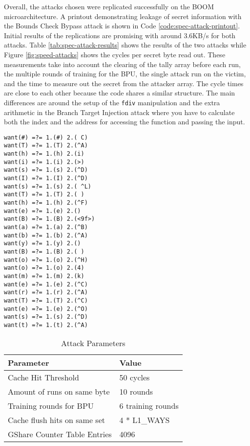 Overall, the attacks chosen were replicated successfully on the BOOM microarchitecture. A printout
demonstrating leakage of secret information with the Bounds Check Bypass attack
is shown in Code \ref{code:spec-attack-printout}. Initial results of the replications
are promising with around 3.6KB/s for both attacks. Table \ref{tab:spec-attack-results}
shows the results of the two attacks while Figure \ref{fig:speed-attacks} shows the cycles per secret byte read out.
These measurements take into account the clearing
of the tally array before each run, the multiple rounds of training for the BPU,
the single attack run on the victim, and the time to measure out the secret from the attacker array.
The cycle times are close to each other because the code shares a similar structure. The main
differences are around the setup of the {\tt fdiv} manipulation
and the extra arithmetic in the Branch Target Injection attack where you have to calculate
both the index and the address for accessing the function and passing the input. 

\begin{lstlisting}[style=column-code, label={code:spec-attack-printout}, caption=Printout of Bounds Check Bypass Attack]
want(#) =?= 1.(#) 2.( C)
want(T) =?= 1.(T) 2.(^A)
want(h) =?= 1.(h) 2.(i)
want(i) =?= 1.(i) 2.(>)
want(s) =?= 1.(s) 2.(^D)
want(I) =?= 1.(I) 2.(^D)
want(s) =?= 1.(s) 2.( ^L)
want(T) =?= 1.(T) 2.( )
want(h) =?= 1.(h) 2.(^F)
want(e) =?= 1.(e) 2.()
want(B) =?= 1.(B) 2.(<9f>)
want(a) =?= 1.(a) 2.(^B)
want(b) =?= 1.(b) 2.(^A)
want(y) =?= 1.(y) 2.()
want(B) =?= 1.(B) 2.( )
want(o) =?= 1.(o) 2.(^H)
want(o) =?= 1.(o) 2.(4)
want(m) =?= 1.(m) 2.(k)
want(e) =?= 1.(e) 2.(^C)
want(r) =?= 1.(r) 2.(^A)
want(T) =?= 1.(T) 2.(^C)
want(e) =?= 1.(e) 2.(^O)
want(s) =?= 1.(s) 2.(^D)
want(t) =?= 1.(t) 2.(^A)
\end{lstlisting}


\begin{table}
\centering
\caption{Attack Parameters}
\label{tab:attack-params}
\begin{tabular}{@{} *2l @{}} \toprule
    Parameter                    & Value \\ \midrule
    Cache Hit Threshold          & 50 cycles \\
    Amount of runs on same byte  & 10 rounds \\
    Training rounds for BPU      & 6 training rounds \\
    Cache flush hits on same set & 4 * L1\_WAYS \\
    GShare Counter Table Entries & 4096 \\ \bottomrule
\end{tabular}
\end{table} 

